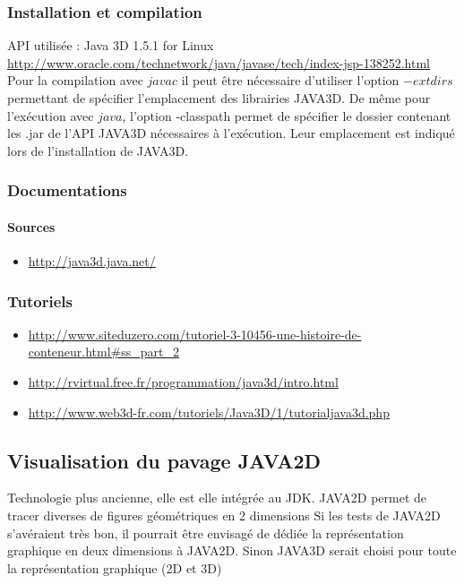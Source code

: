 \documentclass{article}
\begin{document}
\subsubsection{Installation et compilation}
API utilisée : Java 3D 1.5.1 for Linux \\ \url{http://www.oracle.com/technetwork/java/javase/tech/index-jsp-138252.html} \\
Pour la compilation avec $javac$ il peut être nécessaire d'utiliser l'option $-extdirs$  permettant de spécifier l'emplacement des librairies JAVA3D.
De même pour l'exécution avec $java$, l'option -classpath permet de spécifier le dossier contenant les .jar de l'API JAVA3D nécessaires à l'exécution.
Leur emplacement est indiqué lors de l'installation de JAVA3D.

\subsubsection{Documentations}
\paragraph{Sources}
\begin{itemize}
\item 
\url{http://java3d.java.net/}                                                        
\end{itemize}
\subsubsection{Tutoriels}
\begin{itemize}
\item 
\url{http://www.siteduzero.com/tutoriel-3-10456-une-histoire-de-conteneur.html#ss_part_2}
\item
\url{http://rvirtual.free.fr/programmation/java3d/intro.html}
\item
\url{http://www.web3d-fr.com/tutoriels/Java3D/1/tutorialjava3d.php}
\end{itemize}

\subsection{Visualisation du pavage JAVA2D}
Technologie plus ancienne, elle est elle intégrée au JDK. JAVA2D permet de tracer diverses de figures géométriques en 2 dimensions
Si les tests de JAVA2D s'avéraient très bon, il pourrait être envisagé de dédiée la représentation graphique en deux dimensions à JAVA2D.
Sinon JAVA3D serait choisi pour toute la représentation graphique (2D et 3D)
\end{document}
